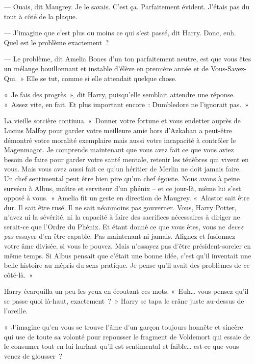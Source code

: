 --- Ouais, dit Maugrey.
Je le savais.
C'est ça.
Parfaitement évident.
J'étais pas du tout à côté de la plaque.

--- J'imagine que c'est plus ou moins ce qui s'est passé, dit Harry.
Donc, euh.
Quel est le problème exactement~?

--- Le problème, dit Amelia Bones d'un ton parfaitement neutre, est que vous êtes un mélange bouillonnant et instable d'élève en première année et de Vous-Savez-Qui.~»
Elle se tut, comme si elle attendait quelque chose.

«~Je fais des progrès~», dit Harry, puisqu'elle semblait attendre une réponse.
«~Assez vite, en fait.
Et plus important encore~: Dumbledore ne l'ignorait pas.~»

La vieille sorcière continua.
«~Donner votre fortune et vous endetter auprès de Lucius Malfoy pour garder votre meilleure amie hors d'Azkaban a peut-être démontré votre moralité exemplaire mais aussi votre incapacité à contrôler le Magenmagot.
Je comprends maintenant que vous avez fait ce que vous aviez besoin de faire pour garder votre santé mentale, retenir les ténèbres qui vivent en vous.
Mais vous avez aussi fait ce qu'un héritier de Merlin ne doit jamais faire.
Un chef sentimental peut être bien pire qu'un chef égoïste.
Nous avons à peine survécu à Albus, maître et serviteur d'un phénix -- et ce jour-là, même lui s'est opposé à vous.~»
Amelia fit un geste en direction de Maugrey.
«~Alastor sait être dur.
Il sait être rusé.
Il ne sait néanmoins pas gouverner.
Vous, Harry Potter, n'avez ni la sévérité, ni la capacité à faire des sacrifices nécessaires à diriger ne serait-ce que l'Ordre du Phénix.
Et étant donné ce que vous êtes, vous ne \emph{devez pas} essayer d'en être capable.
Pas maintenant ni jamais.
Alignez et fusionnez votre âme divisée, si vous le pouvez.
Mais n'essayez pas d'être président-sorcier en même temps.
Si Albus pensait que c'était une bonne idée, c'est qu'il inventait une belle histoire au mépris du sens pratique.
Je pense qu'il avait des problèmes de ce côté-là.~»

Harry écarquilla un peu les yeux en écoutant ces mots.
«~Euh… vous pensez qu'il se passe quoi là-haut, exactement~?~»
Harry se tapa le crâne juste au-dessus de l'oreille.

«~J'imagine qu'en vous se trouve l'âme d'un garçon toujours honnête et sincère qui use de toute sa volonté pour repousser le fragment de Voldemort qui essaie de le consumer tout en lui hurlant qu'il est sentimental et faible… est-ce que vous venez de glousser~?

